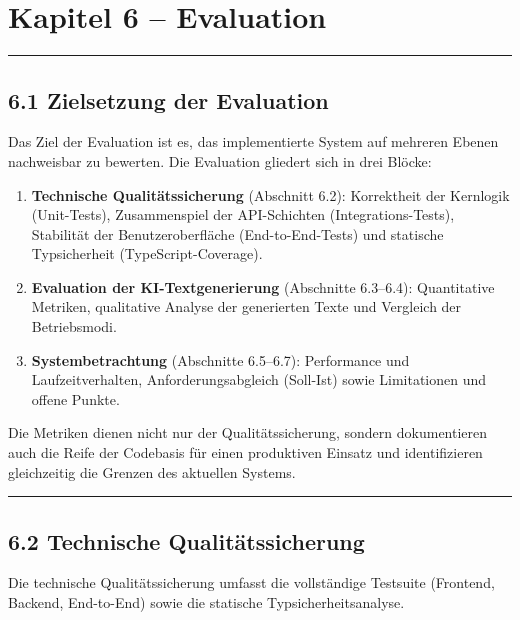 \section{Kapitel 6 -- Evaluation}\label{kapitel-6-evaluation}

\begin{center}\rule{0.5\linewidth}{0.5pt}\end{center}

\subsection{6.1 Zielsetzung der
Evaluation}\label{zielsetzung-der-evaluation}

Das Ziel der Evaluation ist es, das implementierte System auf mehreren
Ebenen nachweisbar zu bewerten. Die Evaluation gliedert sich in drei
Blöcke:

\begin{enumerate}
\def\labelenumi{\arabic{enumi}.}
\tightlist
\item
  \textbf{Technische Qualitätssicherung} (Abschnitt 6.2): Korrektheit
  der Kernlogik (Unit-Tests), Zusammenspiel der API-Schichten
  (Integrations-Tests), Stabilität der Benutzeroberfläche
  (End-to-End-Tests) und statische Typsicherheit (TypeScript-Coverage).
\item
  \textbf{Evaluation der KI-Textgenerierung} (Abschnitte 6.3--6.4):
  Quantitative Metriken, qualitative Analyse der generierten Texte und
  Vergleich der Betriebsmodi.
\item
  \textbf{Systembetrachtung} (Abschnitte 6.5--6.7): Performance und
  Laufzeitverhalten, Anforderungsabgleich (Soll-Ist) sowie Limitationen
  und offene Punkte.
\end{enumerate}

Die Metriken dienen nicht nur der Qualitätssicherung, sondern
dokumentieren auch die Reife der Codebasis für einen produktiven Einsatz
und identifizieren gleichzeitig die Grenzen des aktuellen Systems.

\begin{center}\rule{0.5\linewidth}{0.5pt}\end{center}

\subsection{6.2 Technische
Qualitätssicherung}\label{technische-qualituxe4tssicherung}

Die technische Qualitätssicherung umfasst die vollständige Testsuite
(Frontend, Backend, End-to-End) sowie die statische
Typsicherheitsanalyse.

